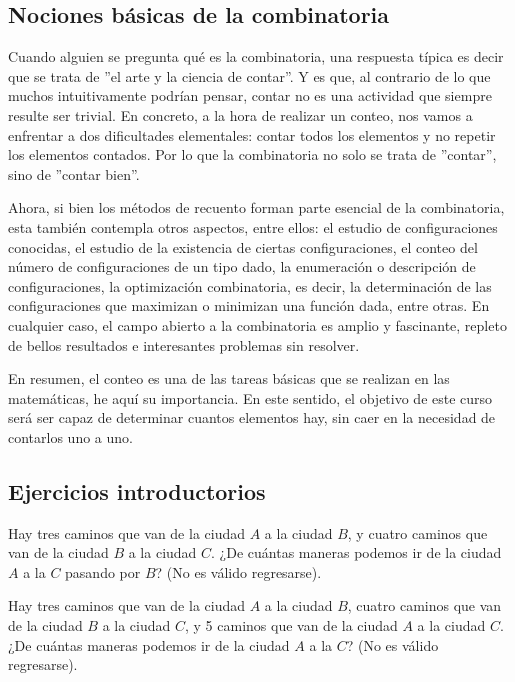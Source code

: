 \documentclass[12pt]{article}
\begin{document}
\subsection{Nociones básicas de la combinatoria}

Cuando alguien se pregunta qué es la combinatoria, una respuesta típica es decir que se trata de ''el arte y la ciencia de contar''. Y es que, al contrario de lo que muchos intuitivamente podrían pensar, contar no es una actividad que siempre resulte ser trivial. En concreto, a la hora de realizar un conteo, nos vamos a enfrentar a dos dificultades elementales: contar todos los elementos y no repetir los elementos contados. Por lo que la combinatoria no solo se trata de ''contar'', sino de ''contar bien''.

Ahora, si bien los métodos de recuento forman parte esencial de la combinatoria, esta también contempla otros aspectos, entre ellos: el estudio de configuraciones conocidas, el estudio de la existencia de ciertas configuraciones, el conteo del número de configuraciones de un tipo dado, la enumeración o descripción de configuraciones, la optimización combinatoria, es decir, la determinación de las configuraciones que maximizan o minimizan una función dada, entre otras. En cualquier caso, el campo abierto a la combinatoria es amplio y fascinante, repleto de bellos resultados e interesantes problemas sin resolver.

En resumen, el conteo es una de las tareas básicas que se realizan en las matemáticas, he aquí su importancia. En este sentido, el objetivo de este curso será ser capaz de determinar cuantos elementos hay, sin caer en la necesidad de contarlos uno a uno.

\subsection{Ejercicios introductorios}

\begin{ejercicio}
    Hay tres caminos que van de la ciudad $A$ a la ciudad $B$, y cuatro caminos que van de la ciudad $B$ a la ciudad $C$. ¿De cuántas maneras podemos ir de la ciudad $A$ a la $C$ pasando por $B$? (No es válido regresarse).
\end{ejercicio}

\begin{ejercicio}
    Hay tres caminos que van de la ciudad $A$ a la ciudad $B$, cuatro caminos que van de la ciudad $B$ a la ciudad $C$, y 5 caminos que van de la ciudad $A$ a la ciudad $C$. ¿De cuántas maneras podemos ir de la ciudad $A$ a la $C$? (No es válido regresarse).
\end{ejercicio}
\end{document}
